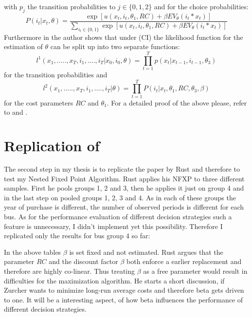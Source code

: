 \documentclass[a4paper,12pt,bold]{scrartcl}
\begin{document}
with \(p_j\) the transition probabilities to \(j \in \{0,1,2\}\) and for the choice probabilities:
\begin{equation}
P(i_t | x_t, \theta) = \frac{\exp[u(x_t, i_t, \theta_1, RC) + \beta EV_{\theta} (i_t * x_t)]}{ \sum_{i_t \in \{0, 1\}}\exp[u(x_t, i_t, \theta_1, RC) + \beta EV_{\theta} (i_t * x_t)]}
\end{equation}
Furthermore in \cite{Rust.1988} the author shows that under (CI) the likelihood function for the estimation of \(\theta\) can be split up into two separate functions:
\begin{equation}
  l^1(x_1, .....,  x_T, i_1, ...., i_T | x_0, i_0, \theta) = \prod_{t = 1}^T p(x_t | x_{t-1}, i_{t-1}, \theta_3)
\end{equation}
for the transition probabilities and
\begin{equation}
  l^2(x_1, .....,  x_T, i_1, ...., i_T | \theta) = \prod_{t = 1}^T P(i_t | x_t, \theta_1, RC, \theta_3, \beta)
\end{equation}
for the cost parameters $RC$ and \(\theta_1\). For a detailed proof of the above please, refer to \cite{Rust.1987} and \cite{Rust.1988}.
\newpage
\section{Replication of \cite{Rust.1987}}
The second step in my thesis is to replicate the paper by Rust and therefore to test my Nested Fixed Point Algorithm. Rust applies his NFXP to three different samples. First he pools groups 1, 2 and 3, then he applies it just on group 4 and in the last step on pooled groups 1, 2, 3 and 4. As in each of these groups the year of purchase is different, the number of observed periods is different for each bus. As for the performance evaluation of different decision strategies such a feature is unnecessary, I didn't implement yet this possibility. Therefore I replicated only the results for bus group 4 so far:
\begin{table}[h]
\begin{center}
  
\end{center}
\end{table}


In the above tables $\beta$ is set fixed and not estimated. Rust argues that the parameter $RC$ and the discount factor $\beta$ both enforce a earlier replacement and therefore are highly co-linear. Thus treating $\beta$ as a free parameter would result in difficulties for the maximization algorithm. He starts a short discussion, if Zurcher wants to minimize long-run average costs and therefore beta gets driven to one. It will be a interesting aspect, of how beta influences the performance of different decision strategies.
\end{document}
